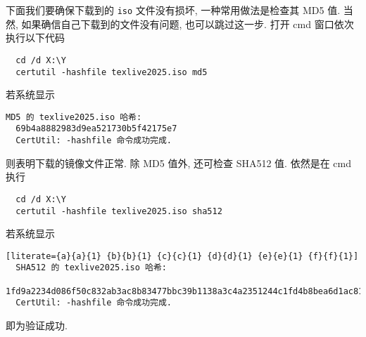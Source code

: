 下面我们要确保下载到的 \texttt{iso} 文件没有损坏, 一种常用做法是检查其 MD5 值.
当然, 如果确信自己下载到的文件没有问题, 也可以跳过这一步.
打开 \textsf{cmd} 窗口依次执行以下代码
\begin{lstlisting}
  cd /d X:\Y
  certutil -hashfile texlive2025.iso md5
\end{lstlisting}
若系统显示
\begin{lstlisting}[language = {}]
  MD5 的 texlive2025.iso 哈希:
  69b4a8882983d9ea521730b5f42175e7
  CertUtil: -hashfile 命令成功完成.
\end{lstlisting}
则表明下载的镜像文件正常.
除 MD5 值外,
还可检查 SHA512 值.
依然是在 \textsf{cmd} 执行
\begin{lstlisting}
  cd /d X:\Y
  certutil -hashfile texlive2025.iso sha512
\end{lstlisting}
若系统显示
\begin{lstlisting}[literate={a}{a}{1} {b}{b}{1} {c}{c}{1} {d}{d}{1} {e}{e}{1} {f}{f}{1}]
  SHA512 的 texlive2025.iso 哈希:
  1fd9a2234d086f50c832ab3ac8b83477bbc39b1138a3c4a2351244c1fd4b8bea6d1ac81d4a5b0cba95f2e82c00f0d9df5b33189eb222e4bae5dae1523ef0da0e
  CertUtil: -hashfile 命令成功完成.
\end{lstlisting}
即为验证成功.

